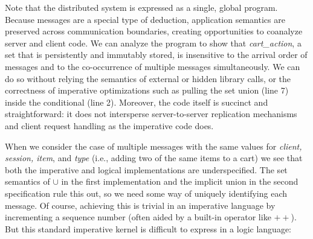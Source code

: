 


Note that the distributed system is expressed as a single, global program.
Because messages are a special type of deduction, application semantics are preserved across communication boundaries, creating opportunities to 
coanalyze server and client code.  We can analyze the program to 
show that {\em cart\_action}, a set that is persistently and immutably
stored, is insensitive to the arrival order of messages 
and to the co-occurrence of multiple messages simultaneously. We can do so without relying
the semantics of external or hidden library calls, or the correctness of imperative optimizations such as pulling the set union (line 7) inside the conditional (line 2).  Moreover, the code itself is succinct and straightforward: it does not intersperse server-to-server replication mechanisms and client request handling as the imperative code does.



When we consider the case of multiple messages with the same values for
{\em client, session, item}, and {\em type} (i.e., adding two of the same items to a cart)
we see that both the imperative and logical implementations are underspecified.
The set semantics of $\cup$ in the first implementation and the implicit union 
in the second specification rule this out, so we need some way of uniquely identifying each message.
Of course, achieving this is trivial in an imperative language by incrementing a sequence number (often aided by a built-in operator like $++$).
But this standard imperative kernel is difficult to express in a logic language:

